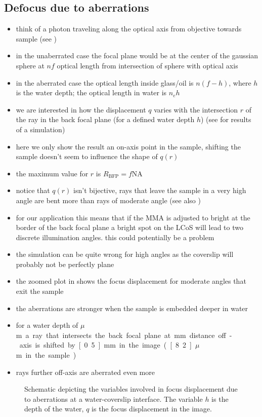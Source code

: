 \documentclass[twocolumn,DIV19]{scrartcl}
\begin{document}
\subsection{Defocus due to aberrations}
\begin{itemize}
\item think of a photon traveling along the optical axis from
  objective towards sample (see )
\item in the unaberrated case the focal plane would be at the center
  of the gaussian sphere at $nf$ optical length from intersection of sphere
  with optical axis
\item in the aberrated case the optical length inside glass/oil is $n(f-h)$,
  where $h$ is the water depth; the optical length in water is $n_eh$
\item we are interested in how the displacement $q$ varies with the
  intersection $r$ of the ray in the back focal plane (for a defined
  water depth $h$) (see  for results of
  a simulation)
\item here we only show the result an on-axis point in the sample,
  shifting the sample doesn't seem to influence the shape of $q(r)$
\item the maximum value for $r$ is $R_\textrm{BFP}=f\textrm{NA}$
\item notice that $q(r)$ isn't bijective, rays that leave the sample
  in a very high angle are bent more than rays of moderate angle (see
  also )
\item {\color{red}for our application this means that if the MMA is
    adjusted to bright at the border of the back focal plane a bright
    spot on the LCoS will lead to two discrete illumination angles.}
  this could potentially be a problem
\item the simulation can be quite wrong for high angles as the
  coverslip will probably not be perfectly plane
\item the zoomed plot in  shows
  the focus displacement for moderate angles that exit the sample
\item the aberrations are stronger when the sample is embedded deeper
  in water
\item for a water depth of \unit[100]{$\mu$m} a ray that intersects
  the back focal plane at \unit[2]{mm} distance off-axis is shifted by
  \unit[0.5]{mm} in the image (\unit[8.2]{$\mu$m} in the sample)
\item rays further off-axis are aberrated even more
\end{itemize}
\begin{figure}
   \centering
   
   \caption{Schematic depicting the variables involved in focus
     displacement due to aberrations at a water-coverslip
     interface. The variable $h$ is the depth of the water, $q$ is the
     focus displacement in the image.}
   \label{fig:aberration-sketch}
 \end{figure}
 
\end{document}
